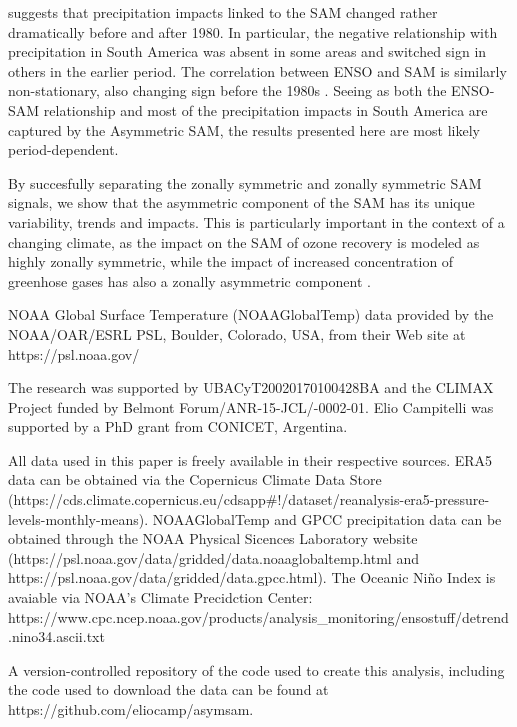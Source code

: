 \documentclass[]{ametsocV5}
\begin{document}
\citet{silvestri2009} suggests that precipitation impacts linked to the SAM changed rather dramatically before and after 1980. In particular, the negative relationship with precipitation in South America was absent in some areas and switched sign in others in the earlier period. The correlation between ENSO and SAM is similarly non-stationary, also changing sign before the 1980s \citep{fogt2006, clem2013}. Seeing as both the ENSO-SAM relationship and most of the precipitation impacts in South America are captured by the Asymmetric SAM, the results presented here are most likely period-dependent.

By succesfully separating the zonally symmetric and zonally symmetric SAM signals, we show that the asymmetric component of the SAM has its unique variability, trends and impacts. This is particularly important in the context of a changing climate, as the impact on the SAM of ozone recovery is modeled as highly zonally symmetric, while the impact of increased concentration of greenhose gases has also a zonally asymmetric component \citep{arblaster2006, simpkins2012}.

\acknowledgments

NOAA Global Surface Temperature (NOAAGlobalTemp) data provided by the NOAA/OAR/ESRL PSL, Boulder, Colorado, USA, from their Web site at https://psl.noaa.gov/

The research was supported by UBACyT20020170100428BA and the CLIMAX Project funded by Belmont Forum/ANR-15-JCL/-0002-01. Elio Campitelli was supported by a PhD grant from CONICET, Argentina.

\datastatement

All data used in this paper is freely available in their respective sources. ERA5 data can be obtained via the Copernicus Climate Data Store (https://cds.climate.copernicus.eu/cdsapp\#!/dataset/reanalysis-era5-pressure-levels-monthly-means). NOAAGlobalTemp and GPCC precipitation data can be obtained through the NOAA Physical Sicences Laboratory website (https://psl.noaa.gov/data/gridded/data.noaaglobaltemp.html and https://psl.noaa.gov/data/gridded/data.gpcc.html). The Oceanic Niño Index is avaiable via NOAA's Climate Precidction Center: https://www.cpc.ncep.noaa.gov/products/analysis\_monitoring/ensostuff/detrend.nino34.ascii.txt

A version-controlled repository of the code used to create this analysis, including the code used to download the data can be found at https://github.com/eliocamp/asymsam.


\end{document}
